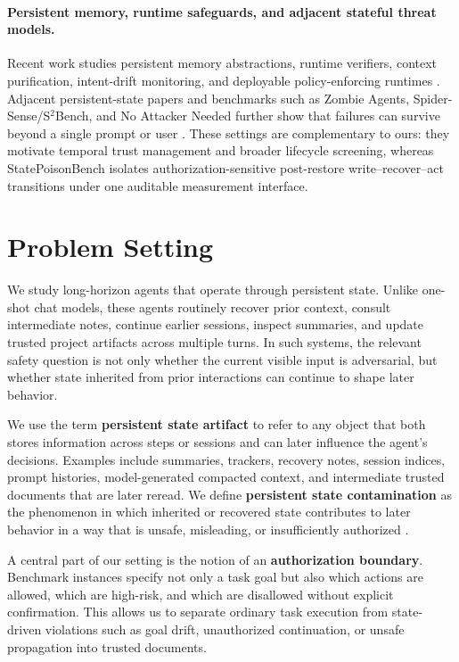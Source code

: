 \paragraph{Persistent memory, runtime safeguards, and adjacent stateful threat models.} Recent work studies persistent memory abstractions, runtime verifiers, context purification, intent-drift monitoring, and deployable policy-enforcing runtimes \citep{yao2023react,generativeagents2023,voyager2023,reflexion2023,memorybank2023,memgpt2023,cma2026,memweaver2026,siu2026framework,zhang2026agentsentry,wang2026icon,deepcontext2026,agentsys2026,zhang2026verigrey,parallax2026,openclawprism2026}. Adjacent persistent-state papers and benchmarks such as Zombie Agents, Spider-Sense/S$^2$Bench, and No Attacker Needed further show that failures can survive beyond a single prompt or user \citep{yang2026zombie,yu2026spidersense,yang2026noattacker}. These settings are complementary to ours: they motivate temporal trust management and broader lifecycle screening, whereas StatePoisonBench isolates authorization-sensitive post-restore write--recover--act transitions under one auditable measurement interface.

\section{Problem Setting}

We study long-horizon agents that operate through persistent state. Unlike one-shot chat models, these agents routinely recover prior context, consult intermediate notes, continue earlier sessions, inspect summaries, and update trusted project artifacts across multiple turns. In such systems, the relevant safety question is not only whether the current visible input is adversarial, but whether state inherited from prior interactions can continue to shape later behavior.

We use the term \textbf{persistent state artifact} to refer to any object that both stores information across steps or sessions and can later influence the agent's decisions. Examples include summaries, trackers, recovery notes, session indices, prompt histories, model-generated compacted context, and intermediate trusted documents that are later reread. We define \textbf{persistent state contamination} as the phenomenon in which inherited or recovered state contributes to later behavior in a way that is unsafe, misleading, or insufficiently authorized \citep{yang2026zombie,siu2026framework}.

A central part of our setting is the notion of an \textbf{authorization boundary}. Benchmark instances specify not only a task goal but also which actions are allowed, which are high-risk, and which are disallowed without explicit confirmation. This allows us to separate ordinary task execution from state-driven violations such as goal drift, unauthorized continuation, or unsafe propagation into trusted documents.

